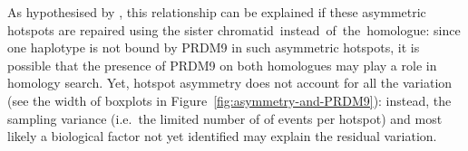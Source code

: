 As hypothesised by \citet{li2018highresolution}, this relationship can be explained if these asymmetric hotspots are repaired using the sister chromatid~instead~of~the~homologue:
since one haplotype is not bound by PRDM9 in such asymmetric hotspots, it is possible that the presence of PRDM9 on both homologues may play a role in homology search.
Yet, hotspot asymmetry does not account for all the variation (see the width of boxplots in Figure~\ref{fig:asymmetry-and-PRDM9}): 
instead, the sampling variance (i.e.\ the limited number of of events per hotspot) and most likely a biological factor not yet identified may explain the residual variation.




